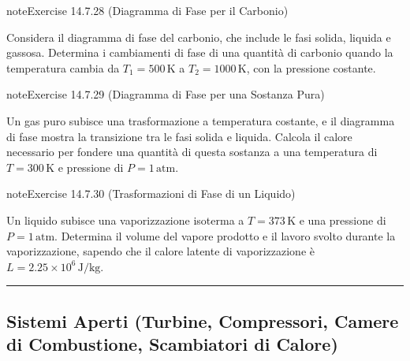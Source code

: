 \documentclass[letterpaper,10pt,italian]{jupyterBook}
\begin{document}
\begin{sphinxadmonition}{note}{Exercise 14.7.28 (Diagramma di Fase per il Carbonio)}



\sphinxAtStartPar
Considera il diagramma di fase del carbonio, che include le fasi solida, liquida e gassosa. Determina i cambiamenti di fase di una quantità di carbonio quando la temperatura cambia da \(T_1 = 500 \, \text{K}\) a \(T_2 = 1000 \, \text{K}\), con la pressione costante.
\end{sphinxadmonition}
 \label{exercise:ch/thermodynamics/principles-problems-exercise-28}

\begin{sphinxadmonition}{note}{Exercise 14.7.29 (Diagramma di Fase per una Sostanza Pura)}



\sphinxAtStartPar
Un gas puro subisce una trasformazione a temperatura costante, e il diagramma di fase mostra la transizione tra le fasi solida e liquida. Calcola il calore necessario per fondere una quantità di questa sostanza a una temperatura di \(T = 300 \, \text{K}\) e pressione di \(P = 1 \, \text{atm}\).
\end{sphinxadmonition}
 \label{exercise:ch/thermodynamics/principles-problems-exercise-29}

\begin{sphinxadmonition}{note}{Exercise 14.7.30 (Trasformazioni di Fase di un Liquido)}



\sphinxAtStartPar
Un liquido subisce una vaporizzazione isoterma a \(T = 373 \, \text{K}\) e una pressione di \(P = 1 \, \text{atm}\). Determina il volume del vapore prodotto e il lavoro svolto durante la vaporizzazione, sapendo che il calore latente di vaporizzazione è \(L = 2.25 \times 10^6 \, \text{J/kg}\).
\end{sphinxadmonition}


\bigskip\hrule\bigskip



\subsection{Sistemi Aperti (Turbine, Compressori, Camere di Combustione, Scambiatori di Calore)}
\label{\detokenize{ch/thermodynamics/principles-problems:sistemi-aperti-turbine-compressori-camere-di-combustione-scambiatori-di-calore}} \label{exercise:ch/thermodynamics/principles-problems-exercise-30}
\end{document}
